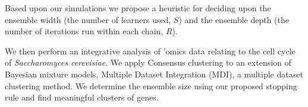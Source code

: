\documentclass{bioinfo}
\begin{document}
Based upon our simulations we propose a heuristic for deciding upon the ensemble width (the number of learners used, $S$) and the ensemble depth (the number of iterations run within each chain, $R$).

We then perform an integrative analysis of 'omics data relating to the cell cycle of \emph{Saccharomyces cerevisiae}. We apply Consensus clustering to an extension of Bayesian mixture models, Multiple Dataset Integration (MDI), a multiple dataset clustering method. We determine the ensemble size using our proposed stopping rule and find meaningful clusters of genes. 




%
\end{document}
